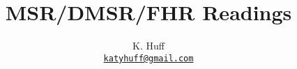 \documentclass[letterpaper]{article}
\author{K. Huff
  \\ \href{mailto:katyhuff@gmail.com}{\texttt{katyhuff@gmail.com}}
}
\date{}
\title{MSR/DMSR/FHR Readings}
\begin{document}
\maketitle
\nocite{*}


\end{document}
